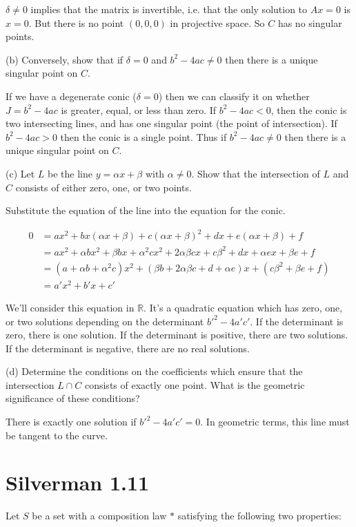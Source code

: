 \documentclass{article}
\begin{document}
$\delta \neq 0$ implies that the matrix is invertible, i.e. that the only solution to $Ax = 0$ is $x = 0$. But there is no point $(0,0,0)$ in projective space. So $C$ has no singular points.

(b) Conversely, show that if $\delta = 0$ and $b^2 - 4ac \neq 0$ then there is a unique singular point on $C$.

If we have a degenerate conic ($\delta = 0$) then we can classify it on whether $J = b^2 - 4ac$ is greater, equal, or less than zero. If $b^2-4ac < 0$, then the conic is two intersecting lines, and has one singular point (the point of intersection). If $b^2 - 4ac > 0$ then the conic is a single point. Thus if $b^2-4ac \neq 0$ then there is a unique singular point on $C$.

(c) Let $L$ be the line $y = \alpha x + \beta$ with $\alpha \neq 0$. Show that the intersection of $L$ and $C$ consists of either zero, one, or two points.

Substitute the equation of the line into the equation for the conic.

\begin{align*}
0 &= ax^2 + bx(\alpha x + \beta) + c(\alpha x + \beta)^2 + dx + e(\alpha x + \beta) + f \\
&= ax^2 + \alpha b x^2 + \beta b x + \alpha^2 c x^2 + 2\alpha\beta c x + c\beta^2 + dx + \alpha e x + \beta e + f \\
&= (a + \alpha b + \alpha^2 c)x^2 + (\beta b + 2\alpha\beta c + d + \alpha e)x + (c\beta^2 + \beta e + f) \\
&= a'x^2 + b'x + c'
\end{align*}

We'll consider this equation in $\mathbb{R}$. It's a quadratic equation which has zero, one, or two solutions depending on the determinant ${b'}^2 - 4a'c'$. If the determinant is zero, there is one solution. If the determinant is positive, there are two solutions. If the determinant is negative, there are no real solutions.

(d) Determine the conditions on the coefficients which ensure that the intersection $L \cap C$ consists of exactly one point. What is the geometric significance of these conditions?

There is exactly one solution if ${b'}^2 - 4a'c' = 0$. In geometric terms, this line must be tangent to the curve.

\section{Silverman 1.11}
Let $S$ be a set with a composition law $*$ satisfying the following two properties:
\end{document}
